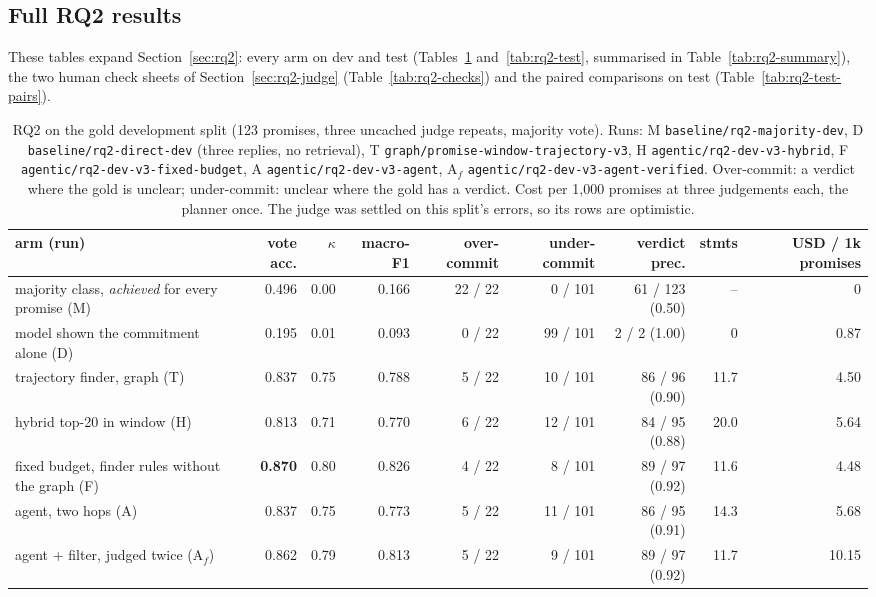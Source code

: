\documentclass[11pt]{article}
\newcommand{\run}[1]{\nolinkurl{#1}}
\newcommand{\kappaval}{$\kappa$}
\begin{document}
\subsection{Full RQ2 results}
\label{app:rq2}
These tables expand Section~\ref{sec:rq2}: every arm on dev and test (Tables~\ref{tab:rq2-main} and~\ref{tab:rq2-test}, summarised in Table~\ref{tab:rq2-summary}), the two human check sheets of Section~\ref{sec:rq2-judge} (Table~\ref{tab:rq2-checks}) and the paired comparisons on test (Table~\ref{tab:rq2-test-pairs}).

\begin{table}[!htbp]
\centering\scriptsize
\setlength{\tabcolsep}{3.5pt}
\begin{tabular*}{\linewidth}{@{}@{\extracolsep{\fill}}lrrrrrrrr@{}}
\toprule
arm (run) & vote acc. & \kappaval & macro-F1 & over-commit & under-commit & verdict prec. & stmts & USD / 1k promises \\
\midrule
majority class, \emph{achieved} for every promise (M) & 0.496 & 0.00 & 0.166 & 22 / 22 & 0 / 101 & 61 / 123 (0.50) & -- & 0 \\
model shown the commitment alone (D) & 0.195 & 0.01 & 0.093 & 0 / 22 & 99 / 101 & 2 / 2 (1.00) & 0 & 0.87 \\
\midrule
trajectory finder, graph (T) & 0.837 & 0.75 & 0.788 & 5 / 22 & 10 / 101 & 86 / 96 (0.90) & 11.7 & 4.50 \\
hybrid top-20 in window (H) & 0.813 & 0.71 & 0.770 & 6 / 22 & 12 / 101 & 84 / 95 (0.88) & 20.0 & 5.64 \\
fixed budget, finder rules without the graph (F) & \textbf{0.870} & 0.80 & 0.826 & 4 / 22 & 8 / 101 & 89 / 97 (0.92) & 11.6 & 4.48 \\
agent, two hops (A) & 0.837 & 0.75 & 0.773 & 5 / 22 & 11 / 101 & 86 / 95 (0.91) & 14.3 & 5.68 \\
agent + filter, judged twice (A$_f$) & 0.862 & 0.79 & 0.813 & 5 / 22 & 9 / 101 & 89 / 97 (0.92) & 11.7 & 10.15 \\
\bottomrule
\end{tabular*}
\caption{RQ2 on the gold development split (123 promises, three uncached judge repeats, majority vote). Runs: M \run{baseline/rq2-majority-dev}, D \run{baseline/rq2-direct-dev} (three replies, no retrieval), T \run{graph/promise-window-trajectory-v3}, H \run{agentic/rq2-dev-v3-hybrid}, F \run{agentic/rq2-dev-v3-fixed-budget}, A \run{agentic/rq2-dev-v3-agent}, A$_f$ \run{agentic/rq2-dev-v3-agent-verified}. Over-commit: a verdict where the gold is unclear; under-commit: unclear where the gold has a verdict. Cost per 1,000 promises at three judgements each, the planner once. The judge was settled on this split's errors, so its rows are optimistic.}
\label{tab:rq2-main}
\end{table}
\end{document}

